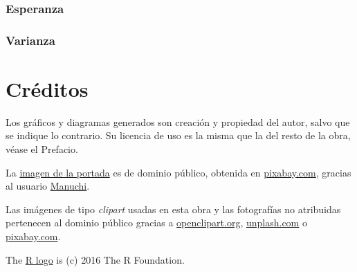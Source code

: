 \documentclass[
]{article}
\begin{document}
\hypertarget{esperanza}{%
\subsubsection{Esperanza}\label{esperanza}}

\hypertarget{varianza}{%
\subsubsection{Varianza}\label{varianza}}

\hypertarget{creditos}{%
\section{Créditos}\label{creditos}}

Los gráficos y diagramas generados son creación y propiedad del autor,
salvo que se indique lo contrario. Su licencia de uso es la misma que la
del resto de la obra, véase el Prefacio.

La
\href{https://pixabay.com/es/illustrations/fondo-abstracto-l\%C3\%ADnea-ilustración-2462436/}{imagen
de la portada} es de dominio público, obtenida en
\href{https://pixabay.com/es/}{pixabay.com}, gracias al usuario
\href{https://pixabay.com/es/users/manuchi-1728328/}{Manuchi}.

Las imágenes de tipo \emph{clipart} usadas en esta obra y las
fotografías no atribuidas pertenecen al dominio público gracias a
\href{http://www.openclipart.org}{openclipart.org},
\href{https://unsplash.com}{unplash.com} o
\href{https://pixabay.com/es/}{pixabay.com}.

The \href{https://www.r-project.org/logo/}{R logo} is (c) 2016 The R
Foundation.
\end{document}
